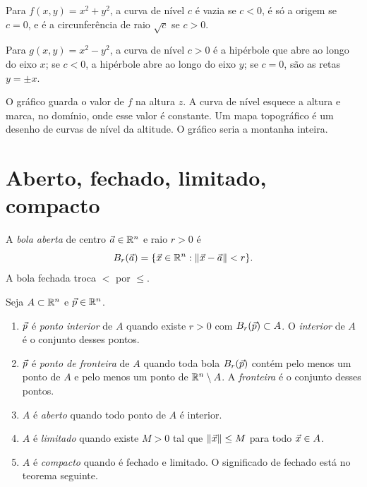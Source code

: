 \documentclass[11pt,a4paper]{article}
\begin{document}
\begin{exemplo}
Para $f(x,y)=x^2+y^2$, a curva de nível $c$ é vazia se $c<0$, é só a origem se $c=0$, e é a circunferência de raio $\sqrt{c}$ se $c>0$.

Para $g(x,y)=x^2-y^2$, a curva de nível $c>0$ é a hipérbole que abre ao longo do eixo $x$; se $c<0$, a hipérbole abre ao longo do eixo $y$; se $c=0$, são as retas $y=\pm x$.
\end{exemplo}


\begin{intuicao}
O gráfico guarda o valor de $f$ na altura $z$. A curva de nível esquece a altura e marca, no domínio, onde esse valor é constante. Um mapa topográfico é um desenho de curvas de nível da altitude. O gráfico seria a montanha inteira.
\end{intuicao}

\section{Aberto, fechado, limitado, compacto}

\begin{definicao}
A \emph{bola aberta} de centro $\vec{a}\in\mathbb{R}^n$ e raio $r>0$ é
\[
B_r(\vec{a})=\{\vec{x}\in\mathbb{R}^n:\left\lVert \vec{x}-\vec{a} \right\rVert<r\}.
\]
A bola fechada troca $<$ por $\le$.
\end{definicao}

\begin{definicao}
Seja $A\subset\mathbb{R}^n$ e $\vec{p}\in\mathbb{R}^n$.
\begin{enumerate}[leftmargin=1.4em]
\item $\vec{p}$ é \emph{ponto interior} de $A$ quando existe $r>0$ com $B_r(\vec{p})\subset A$. O \emph{interior} de $A$ é o conjunto desses pontos.
\item $\vec{p}$ é \emph{ponto de fronteira} de $A$ quando toda bola $B_r(\vec{p})$ contém pelo menos um ponto de $A$ e pelo menos um ponto de $\mathbb{R}^n\setminus A$. A \emph{fronteira} é o conjunto desses pontos.
\item $A$ é \emph{aberto} quando todo ponto de $A$ é interior.
\item $A$ é \emph{limitado} quando existe $M>0$ tal que $\left\lVert \vec{x} \right\rVert\le M$ para todo $\vec{x}\in A$.
\item $A$ é \emph{compacto} quando é fechado e limitado. O significado de fechado está no teorema seguinte.
\end{enumerate}
\end{definicao}
\end{document}
